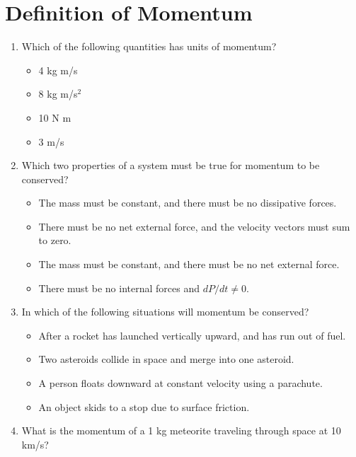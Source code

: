 \documentclass[10pt]{article}
\begin{document}
\maketitle

\section{Definition of Momentum}
\begin{enumerate}
\item Which of the following quantities has units of momentum?
\begin{itemize}
\item 4 kg m/s
\item 8 kg m/s$^2$
\item 10 N m
\item 3 m/s
\end{itemize}
\item Which two properties of a system must be true for momentum to be conserved?
\begin{itemize}
\item The mass must be constant, and there must be no dissipative forces.
\item There must be no net external force, and the velocity vectors must sum to zero.
\item The mass must be constant, and there must be no net external force.
\item There must be no internal forces and $dP/dt \neq 0$.
\end{itemize}
\item In which of the following situations will momentum be conserved?
\begin{itemize}
\item After a rocket has launched vertically upward, and has run out of fuel.
\item Two asteroids collide in space and merge into one asteroid.
\item A person floats downward at constant velocity using a parachute.
\item An object skids to a stop due to surface friction.
\end{itemize}
\item What is the momentum of a 1 kg meteorite traveling through space at 10 km/s? \\ \vspace{1cm}
\end{enumerate}
\end{document}
